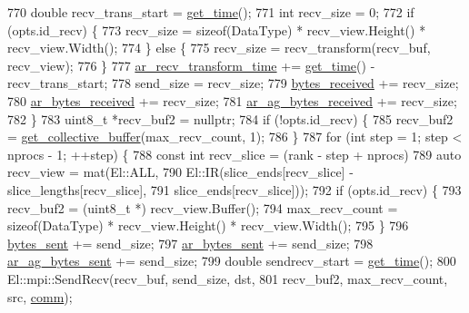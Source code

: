 \begin{DoxyCode}
{770     \textcolor{keywordtype}{double} recv\_trans\_start = \hyperlink{namespacelbann_a478d36031ff0659893c4322cd856157f}{get\_time}();
771     \textcolor{keywordtype}{int} recv\_size = 0;
772     \textcolor{keywordflow}{if} (opts.id\_recv) \{
773       recv\_size = \textcolor{keyword}{sizeof}(DataType) * recv\_view.Height() * recv\_view.Width();
774     \} \textcolor{keywordflow}{else} \{
775       recv\_size = recv\_transform(recv\_buf, recv\_view);
776     \}
777     \hyperlink{classlbann_1_1lbann__comm_adb393f47d60eaa59bace80d2d3dd3bf2}{ar\_recv\_transform\_time} += \hyperlink{namespacelbann_a478d36031ff0659893c4322cd856157f}{get\_time}() - recv\_trans\_start;
778     send\_size = recv\_size;
779     \hyperlink{classlbann_1_1lbann__comm_afb99f57f7eafc0695bf28e6c26a8120f}{bytes\_received} += recv\_size;
780     \hyperlink{classlbann_1_1lbann__comm_aa5f3c53358bf9002b9fab41918b0c8c1}{ar\_bytes\_received} += recv\_size;
781     \hyperlink{classlbann_1_1lbann__comm_afded6f478dc5021d1edec306dc6c528c}{ar\_ag\_bytes\_received} += recv\_size;
782   \}
783   uint8\_t *recv\_buf2 = \textcolor{keyword}{nullptr};
784   \textcolor{keywordflow}{if} (!opts.id\_recv) \{
785     recv\_buf2 = \hyperlink{classlbann_1_1lbann__comm_ae925ac5eaf2895717c709b252961b3bf}{get\_collective\_buffer}(max\_recv\_count, 1);
786   \}
787   \textcolor{keywordflow}{for} (\textcolor{keywordtype}{int} step = 1; step < nprocs - 1; ++step) \{
788     \textcolor{keyword}{const} \textcolor{keywordtype}{int} recv\_slice = (rank - step + nprocs) %
789     \textcolor{keyword}{auto} recv\_view = mat(El::ALL,
790                          El::IR(slice\_ends[recv\_slice] - slice\_lengths[recv\_slice],
791                                 slice\_ends[recv\_slice]));
792     \textcolor{keywordflow}{if} (opts.id\_recv) \{
793       recv\_buf2 = (uint8\_t *) recv\_view.Buffer();
794       max\_recv\_count = \textcolor{keyword}{sizeof}(DataType) * recv\_view.Height() * recv\_view.Width();
795     \}
796     \hyperlink{classlbann_1_1lbann__comm_ad1f146ae7337ece6266fd307944928e0}{bytes\_sent} += send\_size;
797     \hyperlink{classlbann_1_1lbann__comm_aa520c16eafde742b70daf60866afc6a8}{ar\_bytes\_sent} += send\_size;
798     \hyperlink{classlbann_1_1lbann__comm_a2cfe1264a83865360692c48d7869fe67}{ar\_ag\_bytes\_sent} += send\_size;
799     \textcolor{keywordtype}{double} sendrecv\_start = \hyperlink{namespacelbann_a478d36031ff0659893c4322cd856157f}{get\_time}();
800     El::mpi::SendRecv(recv\_buf, send\_size, dst,
801                       recv\_buf2, max\_recv\_count, src, \hyperlink{file__io_8cpp_ab048c6f9fcbcfaa57ce68b00263dbebe}{comm});
}
\end{DoxyCode}
